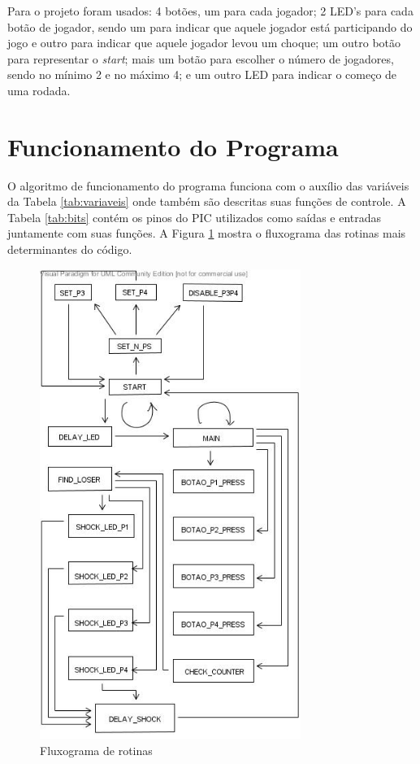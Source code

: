 \documentclass[article]{IEEEtran}
\begin{document}
Para o projeto foram usados: 4 botões, um para cada jogador; 2 LED's para cada botão de jogador, sendo um para indicar que aquele jogador está participando do jogo e outro para indicar que aquele jogador levou um choque; um outro botão para representar o \textit{start}; mais um botão para escolher o número de jogadores, sendo no mínimo 2 e no máximo 4; e um outro LED para indicar o começo de uma rodada. 
 
\section{Funcionamento do Programa}
O algoritmo de funcionamento do programa funciona com o auxílio das variáveis da Tabela \ref{tab:variaveis} onde também são descritas suas funções de controle. A Tabela \ref{tab:bits} contém os pinos do PIC utilizados como saídas e entradas juntamente com suas funções. A Figura \ref{fig:fluxograma} mostra o fluxograma das rotinas  mais determinantes do código.

\begin{figure}	
		\centering
		\includegraphics[width=8.5cm]{./fluxograma.jpg}
		\caption{Fluxograma de rotinas}
 		\label{fig:fluxograma}
\end{figure}
\end{document}
